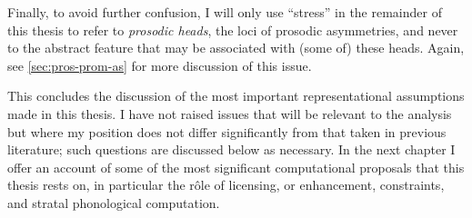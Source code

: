 Finally, to avoid further confusion, I will only use \enquote{stress} in the remainder of this thesis to refer to \emph{prosodic heads}, \ie the loci of prosodic asymmetries, and never to the abstract feature that may be associated with (some of) these heads. Again, see \cref{sec:pros-prom-as} for more discussion of this issue.

This concludes the discussion of the most important representational assumptions made in this thesis. I have not raised issues that will be relevant to the analysis but where my position does not differ significantly from that taken in previous literature; such questions are discussed below as necessary. In the next chapter I offer an account of some of the most significant computational proposals that this thesis rests on, in particular the rôle of licensing, or enhancement, constraints, and stratal phonological computation.
